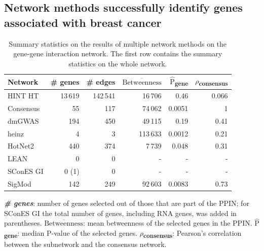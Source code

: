 \documentclass[twocolumn, 11pt]{article}
\newcommand{\mean}[1]{$\overline{\mbox{#1}}$}
\newcommand{\median}[1]{$\hat{\mbox{#1}}$}
\begin{document}
\subsection{Network methods successfully identify genes associated with breast cancer}
\label{results:separate_networks}
\begin{table}[htbp]
  \centering
  \begin{threeparttable}
\caption{\label{tab:gene_solutions}
Summary statistics on the results of multiple network methods on the gene-gene interaction network. The first row contains the summary statistics on the whole network.}
\centering
\begin{tabular}{lrrrrr}
Network & \# genes & \# edges & \mean{Betweenness} & \median{P}\textsubscript{gene} & \(\rho\)\textsubscript{consensus}\\
\hline
HINT HT & 13\,619 & 142\,541 & 16\,706 & 0.46 & 0.066\\
\hline
Consensus & 55 & 117 & 74\,062 & 0.0051 & 1\\
dmGWAS & 194 & 450 & 49\,115 & 0.19 & 0.41\\
heinz & 4 & 3 & 113\,633 & 0.0012 & 0.21\\
HotNet2 & 440 & 374 & 7\,739 & 0.048 & 0.31\\
LEAN & 0 & 0 & - & - & -\\
SConES GI & 0 (1) & 0 & - & - & -\\
SigMod & 142 & 249 & 92\,603 & 0.0083 & 0.73\\
\end{tabular}
\begin{tablenotes}
  \footnotesize{
    \item \textbf{\emph{\# genes}}: number of genes selected out of those that are part of the PPIN; for SConES GI the total number of genes, including RNA genes, was added in parentheses. \textbf{\mean{Betweenness}}: mean betweenness of the selected genes in the PPIN. \textbf{\median{P}\textsubscript{gene}}: median P-value of the selected genes. \textbf{\(\rho\)\textsubscript{consensus}}: Pearson's correlation between the subnetwork and the consensus network.
  }
\end{tablenotes}
\end{threeparttable}
\end{table}
\end{document}
